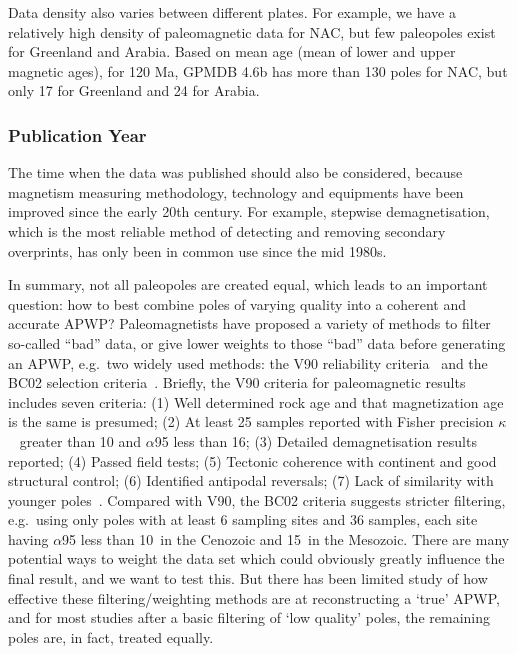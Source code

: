 Data density also varies between different plates. For example, we have a
relatively high density of paleomagnetic data for NAC, but few paleopoles exist
for Greenland and Arabia. Based on mean age (mean of lower and upper magnetic
ages), for 120 Ma, GPMDB 4.6b has more than 130 poles for NAC, but
only 17 for Greenland and 24 for Arabia.

\subsubsection{Publication Year}\label{sec:puby}

The time when the data was published should also be considered, because
magnetism measuring methodology, technology and equipments have been improved
since the early 20th century. For example, stepwise demagnetisation, which is
the most reliable method of detecting and removing secondary overprints, has
only been in common use since the mid 1980s.

In summary, not all paleopoles are created equal, which leads to an important
question: how to best combine poles of varying quality into a coherent and
accurate APWP\@? Paleomagnetists have proposed a variety of methods to filter
so-called ``bad'' data, or give lower weights to those ``bad'' data before
generating an APWP, e.g.\ two widely used methods: the V90 reliability
criteria~\citep{v90} and the BC02 selection criteria~\citep{B02}. Briefly, the
V90 criteria for paleomagnetic results includes seven criteria: (1) Well
determined rock age and that magnetization age is the same is presumed; (2) At
least 25 samples reported with Fisher precision $\kappa$~\citep{F53} greater
than 10 and $\alpha$95 less than 16\degree; (3) Detailed demagnetisation results
reported; (4) Passed field tests; (5) Tectonic coherence with continent and good
structural control; (6) Identified antipodal reversals; (7) Lack of similarity
with younger poles~\citep{T92}. Compared with V90, the BC02 criteria suggests
stricter filtering, e.g.\ using only poles with at least 6 sampling sites and 36
samples, each site having $\alpha$95 less than 10\degree\ in the Cenozoic and
15\degree\ in the Mesozoic. There are many potential ways to weight the data set
which could obviously greatly influence the final result, and we want to test
this. But there has been limited study of how effective these
filtering/weighting methods are at reconstructing a `true' APWP, and for most
studies after a basic filtering of `low quality' poles, the remaining poles are,
in fact, treated equally.

